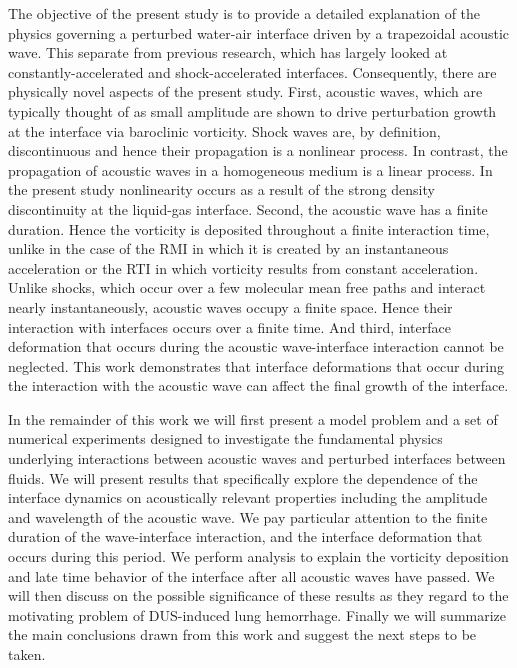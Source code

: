 The objective of the present study is to provide a detailed
explanation of the physics governing a perturbed water-air interface
driven by a trapezoidal acoustic wave. This separate from previous
research, which has largely looked at constantly-accelerated and
shock-accelerated interfaces. Consequently, there are physically novel
aspects of the present study. First, acoustic waves, which are
typically thought of as small amplitude are shown to drive
perturbation growth at the interface via baroclinic vorticity. Shock
waves are, by definition, discontinuous and hence their propagation is
a nonlinear process. In contrast, the propagation of acoustic waves in
a homogeneous medium is a linear process. In the present study
nonlinearity occurs as a result of the strong density discontinuity at
the liquid-gas interface. Second, the acoustic wave has a finite
duration. Hence the vorticity is deposited throughout a finite
interaction time, unlike in the case of the \ac{RMI} in which it is
created by an instantaneous acceleration or the \ac{RTI} in which
vorticity results from constant acceleration. Unlike shocks, which
occur over a few molecular mean free paths and interact nearly
instantaneously, acoustic waves occupy a finite space. Hence their
interaction with interfaces occurs over a finite time. And third,
interface deformation that occurs during the acoustic wave-interface
interaction cannot be neglected. This work demonstrates that interface
deformations that occur during the interaction with the acoustic wave
can affect the final growth of the interface.

In the remainder of this work we will first present a model problem
and a set of numerical experiments designed to investigate the
fundamental physics underlying interactions between acoustic waves and
perturbed interfaces between fluids. We will present results that
specifically explore the dependence of the interface dynamics on
acoustically relevant properties including the amplitude and
wavelength of the acoustic wave. We pay particular attention to the
finite duration of the wave-interface interaction, and the interface
deformation that occurs during this period. We perform analysis to
explain the vorticity deposition and late time behavior of the
interface after all acoustic waves have passed. We will then discuss
on the possible significance of these results as they regard to the
motivating problem of \ac{DUS}-induced lung hemorrhage. Finally we
will summarize the main conclusions drawn from this work and suggest
the next steps to be taken.

